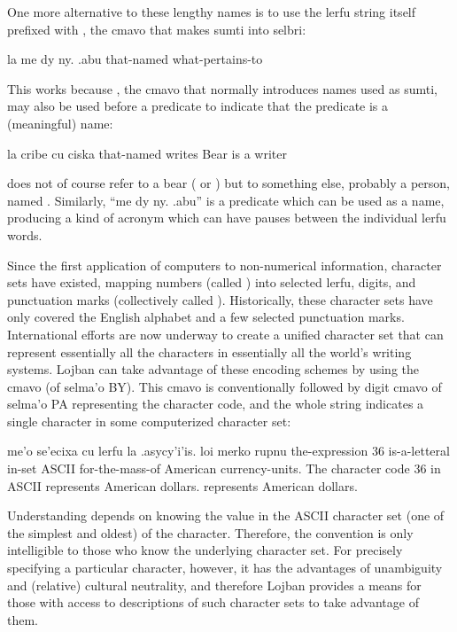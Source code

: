 One more alternative to these lengthy names is to use the lerfu
    string itself prefixed with , the cmavo that makes sumti
    into selbri:
\begin{example}
la me dy ny. .abu\n
that-named what-pertains-to   
\end{example}

This works because , the cmavo that normally
    introduces names used as sumti, may also be used before a
    predicate to indicate that the predicate is a (meaningful)
    name:
\begin{example}
la cribe cu ciska\n
that-named  writes\n
Bear is a writer
\end{example}

 does not of course refer to a
    bear ( or ) but to something else,
    probably a person, named . Similarly, ``me dy ny.
    .abu'' is a predicate which can be used as a name, producing a
    kind of acronym which can have pauses between the individual
    lerfu words.



Since the first application of computers to non-numerical
    information, character sets have existed, mapping numbers
    (called ) into selected lerfu, digits, and
    punctuation marks (collectively called ).
    Historically, these character sets have only covered the
    English alphabet and a few selected punctuation marks.
    International efforts are now underway to create a unified
    character set that can represent essentially all the characters
    in essentially all the world's writing systems. Lojban can take
    advantage of these encoding schemes by using the cmavo 
    (of selma'o BY). This cmavo is conventionally followed by digit
    cmavo of selma'o PA representing the character code, and the
    whole string indicates a single character in some computerized
    character set:
\begin{example}
me'o se'ecixa cu lerfu\n
\T	la .asycy'i'is. loi merko rupnu\n
the-expression  36 is-a-letteral\n
\T	in-set ASCII\n
\T	for-the-mass-of American currency-units.\n
The character code 36 in ASCII represents\n
\T	American dollars.\n
{} represents American dollars.
\end{example}

Understanding  depends on
    knowing the value in the ASCII character set (one of the
    simplest and oldest) of the  character.
    Therefore, the  convention is only intelligible to
    those who know the underlying character set. For precisely
    specifying a particular character, however, it has the
    advantages of unambiguity and (relative) cultural neutrality,
    and therefore Lojban provides a means for those with access to
    descriptions of such character sets to take advantage of them. 

